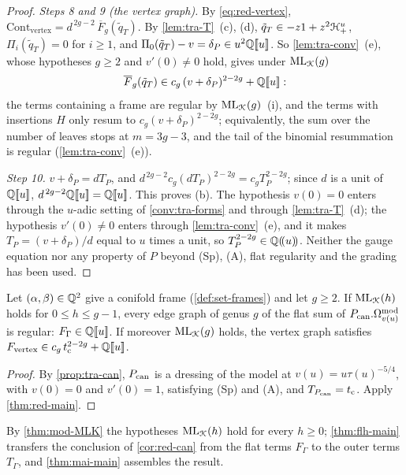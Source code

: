 \begin{proof}
\emph{Steps 8 and 9 (the vertex graph).} By \eqref{eq:red-vertex}, $\mathrm{Cont}_{\mathrm{vertex}} = d^{\,2g-2}\,\overline F_g(\tilde q_T)$. By \cref{lem:tra-T}~(c), (d), $\tilde q_T\in -z1+z^2\mathcal{H}^u_+$, $\Pi_i(\tilde q_T) = 0$ for $i\geq 1$, and $\Pi_0(\tilde q_T)-v = \delta_P\in u^2\mathbb{Q}[\![ u ]\!]$. So \cref{lem:tra-conv}~(e), whose hypotheses $g\geq 2$ and $v'(0)\neq 0$ hold, gives under $\mathrm{ML}_{\mathcal{K}}(g)$
\[
\overline F_g(\tilde q_T)\in c_g\,(v+\delta_P)^{2-2g}+\mathbb{Q}[\![ u ]\!] :
\]
the terms containing a frame are regular by $\mathrm{ML}_{\mathcal{K}}(g)$~(i), and the terms with insertions $H$ only resum to $c_g(v+\delta_P)^{2-2g}$; equivalently, the sum over the number of leaves stops at $m = 3g-3$, and the tail of the binomial resummation is regular (\cref{lem:tra-conv}~(e)).

\emph{Step 10.} $v+\delta_P = dT_P$, and $d^{\,2g-2}c_g(dT_P)^{2-2g} = c_gT_P^{2-2g}$; since $d$ is a unit of $\mathbb{Q}[\![ u ]\!]$, $d^{\,2g-2}\mathbb{Q}[\![ u ]\!] = \mathbb{Q}[\![ u ]\!]$. This proves (b). The hypothesis $v(0) = 0$ enters through the $u$-adic setting of \cref{conv:tra-forms} and through \cref{lem:tra-T}~(d); the hypothesis $v'(0)\neq 0$ enters through \cref{lem:tra-conv}~(e), and it makes $T_P = (v+\delta_P)/d$ equal to $u$ times a unit, so $T_P^{2-2g}\in\mathbb{Q}(\!(u)\!)$. Neither the gauge equation nor any property of $P$ beyond (Sp), (A), flat regularity and the grading has been used.
\end{proof}

\begin{cor}
\label{cor:red-can}
Let $(\alpha,\beta)\in\mathbb{Q}^2$ give a conifold frame (\cref{def:set-frames}) and let $g\geq 2$. If $\mathrm{ML}_{\mathcal{K}}(h)$ holds for $0\leq h\leq g-1$, every edge graph of genus $g$ of the flat sum of $P_{\mathrm{can}}.\Omega^{\mathrm{mod}}_{v(u)}$ is regular: $F_\Gamma\in\mathbb{Q}[\![ u ]\!]$. If moreover $\mathrm{ML}_{\mathcal{K}}(g)$ holds, the vertex graph satisfies $F_{\mathrm{vertex}}\in c_g\,t_{\mathrm{c}}^{2-2g}+\mathbb{Q}[\![ u ]\!]$.
\end{cor}

\begin{proof}
By \cref{prop:tra-can}, $P_{\mathrm{can}}$ is a dressing of the model at $v(u) = u\tau(u)^{-5/4}$, with $v(0) = 0$ and $v'(0) = 1$, satisfying (Sp) and (A), and $T_{P_{\mathrm{can}}} = t_{\mathrm{c}}$. Apply \cref{thm:red-main}.
\end{proof}

By \cref{thm:mod-MLK} the hypotheses $\mathrm{ML}_{\mathcal{K}}(h)$ hold for every $h\geq 0$; \cref{thm:flh-main} transfers the conclusion of \cref{cor:red-can} from the flat terms $F_\Gamma$ to the outer terms $T_\Gamma$, and \cref{thm:mai-main} assembles the result.

